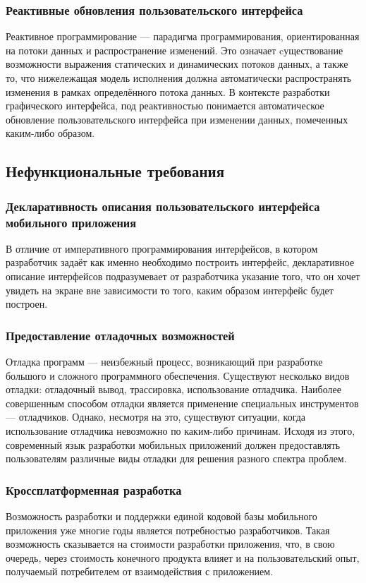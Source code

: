 \subsubsection*{Реактивные обновления пользовательского интерфейса}
Реактивное программирование --- парадигма программирования, ориентированная
на потоки данных и распространение изменений. Это означает cуществование
возможности выражения статических и динамических потоков данных, а также то,
что нижележащая модель исполнения должна автоматически распространять
изменения в рамках определённого потока данных. В контексте
разработки графического интерфейса, под реактивностью понимается
автоматическое обновление пользовательского интерфейса при изменении
данных, помеченных каким-либо образом.

\subsection{Нефункциональные требования}
\subsubsection*{Декларативность описания пользовательского интерфейса мобильного приложения}
В отличие от императивного программирования интерфейсов, в котором
разработчик задаёт как именно необходимо построить интерфейс, декларативное
описание интерфейсов подразумевает от разработчика указание того, что он
хочет увидеть на экране вне зависимости то того, каким образом интерфейс
будет построен.

\subsubsection*{Предоставление отладочных возможностей}
Отладка программ --- неизбежный процесс, возникающий при разработке
большого и сложного программного обеспечения. Существуют несколько видов
отладки: отладочный вывод, трассировка, использование отладчика.
Наиболее совершенным способом отладки является применение
специальных инструментов --- отладчиков. Однако, несмотря на это,
существуют ситуации, когда использование отладчика невозможно по каким-либо
причинам. Исходя из этого, современный язык разработки мобильных приложений
должен предоставлять пользователям различные виды отладки для решения
разного спектра проблем.

\subsubsection*{Кроссплатформенная разработка}
Возможность разработки и поддержки единой кодовой базы мобильного приложения
уже многие годы является потребностью разработчиков. Такая возможность
сказывается на стоимости разработки приложения, что, в свою очередь,
через стоимость конечного продукта влияет и на пользовательский опыт,
получаемый потребителем от взаимодействия с приложением.

